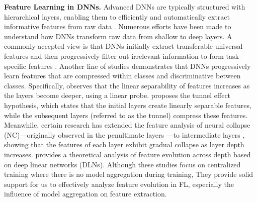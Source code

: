 \textbf{Feature Learning in DNNs.} Advanced DNNs are typically structured with hierarchical layers, enabling them to efficiently and automatically extract informative features from raw data \cite{krizhevsky2012imagenet, allen2023backward, wang2023understanding}. Numerous efforts have been made to understand how DNNs transform raw data from shallow to deep layers. A commonly accepted view is that DNNs initially extract transferable universal features and then progressively filter out irrelevant information to form task-specific features \cite{yosinski2014transferable, zeiler2014visualizing, evci2022head2toe, kumar2022finetuning}. Another line of studies demonstrates that DNNs progressively learn features that are compressed within classes and discriminative between classes. Specifically, \cite{alain2017understanding} observes that the linear separability of features increases as the layers become deeper, using a linear probe. \cite{masarczyk2024tunnel} proposes the tunnel effect hypothesis, which states that the initial layers create linearly separable features, while the subsequent layers (referred to as the tunnel) compress these features. Meanwhile, certain research has extended the feature analysis of neural collapse (NC)—originally observed in the penultimate layers \cite{NC}—to intermediate layers \cite{ansuini2019intrinsic, rangamani2023feature, li2024understanding}, showing that the features of each layer exhibit gradual collapse as layer depth increases. \cite{wang2023understanding} provides a theoretical analysis of feature evolution across depth based on deep linear networks (DLNs). Although these studies focus on centralized training where there is no model aggregation during training, They provide solid support for us to effectively analyze feature evolution in FL, especially the influence of model aggregation on feature extraction.